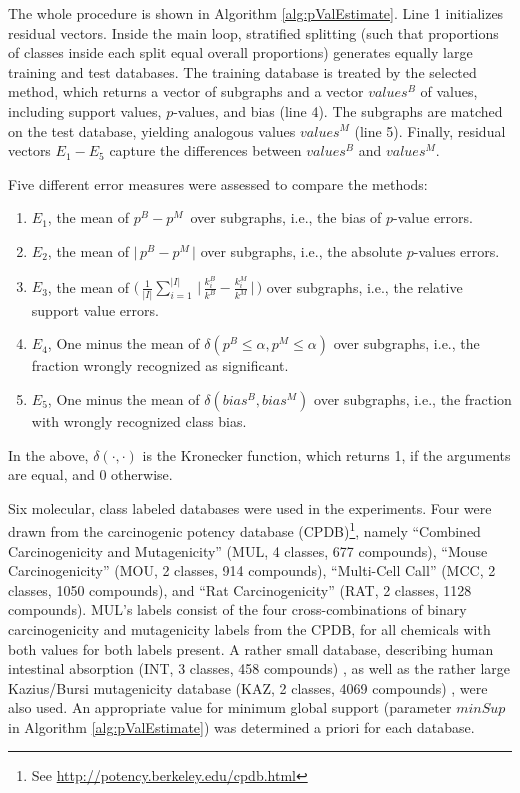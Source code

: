 \documentclass{sig-alternate}
\begin{document}
The whole procedure is shown in Algorithm \ref{alg:pValEstimate}.
Line 1 initializes residual vectors.
Inside the main loop, stratified splitting (such that proportions of classes
inside each split equal overall proportions) generates equally large training and test
databases. The training database is treated by the selected method, which
returns a vector of subgraphs and a vector $values^B$ of values,
including support values, $p$-values, and bias (line 4). The subgraphs are matched on
the test database, yielding analogous values $values^M$ (line 5). Finally, 
residual vectors $E_1-E_5$ capture the differences between $values^B$ and
$values^M$.

Five different
error measures were assessed to compare the methods:
\begin{enumerate}
  \item $E_1$, the mean of     $ p^B -p^M \,$                                                                                    over subgraphs, i.e., the bias of $p$-value errors.
  \item $E_2$, the mean of     $ \Big|\,p^B -p^M \,\Big|$                                                                        over subgraphs, i.e., the absolute $p$-values errors.
  \item $E_3$, the mean of     $ \Big(\,\frac{1}{|I|} \sum_{i=1}^{|I|} \,\Big|\,\frac{k^B_i}{k^B} - \frac{k^M_i}{k^M} \,\Big|\,\Big)$ over subgraphs, i.e., the relative support value errors.
  \item $E_4$, One minus the mean of $ \delta(p^B \le \alpha, p^M \le \alpha)$                                                         over subgraphs, i.e., the fraction wrongly recognized as significant.
  \item $E_5$, One minus the mean of $ \delta(bias^B, bias^M)$                                                                        over subgraphs, i.e., the fraction with wrongly recognized class bias.

\end{enumerate}
In the above, $\delta(\cdot,\cdot)$ is the Kronecker function, which returns 1, if the arguments are equal, and 0 otherwise.

Six molecular, class labeled databases were used in the experiments. 
Four were drawn from the carcinogenic potency database
(CPDB)\footnote{See \url{http://potency.berkeley.edu/cpdb.html}}, namely 
``Combined Carcinogenicity and Mutagenicity'' (MUL, 4 classes, 677 compounds),
``Mouse Carcinogenicity'' (MOU, 2 classes, 914 compounds), 
``Multi-Cell Call'' (MCC, 2 classes, 1050 compounds), and 
``Rat Carcinogenicity'' (RAT, 2 classes, 1128 compounds). 
MUL's labels consist of the four cross-combinations of binary carcinogenicity
and mutagenicity labels from the CPDB, for all chemicals with both values for
both labels present.
A rather small database, describing human intestinal absorption (INT, 3 classes,
458 compounds) \cite{Suenderhauf10Combinatorial}, as well as the rather large
Kazius/Bursi mutagenicity database (KAZ, 2 classes, 4069 compounds)
\cite{kazius05derivation}, were also used. An appropriate value for minimum global
support (parameter $minSup$ in Algorithm \ref{alg:pValEstimate}) was determined a
priori for each database.
\end{document}
